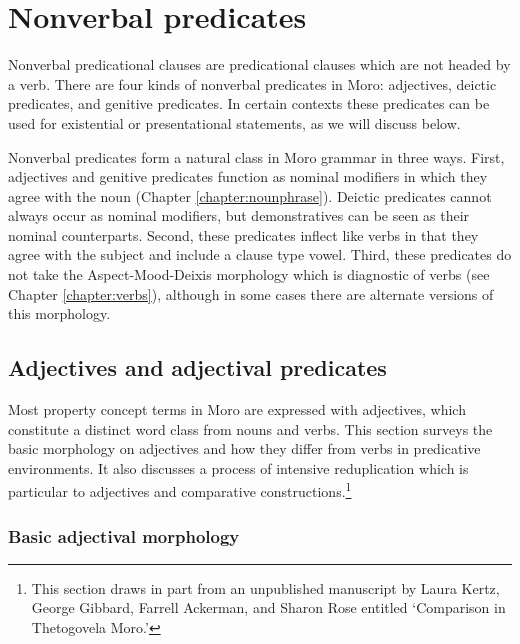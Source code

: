 \chapter{Nonverbal predicates}\label{chapter:nonverbal}

Nonverbal predicational clauses are predicational clauses which are not headed by a verb. There are four kinds of nonverbal predicates in Moro: adjectives, deictic predicates, and genitive predicates. In certain contexts these predicates can be used for existential or presentational statements, as we will discuss below. 

Nonverbal predicates form a natural class in Moro grammar in three ways. First, adjectives and genitive predicates function as nominal modifiers in which they agree with the noun (Chapter \ref{chapter:nounphrase}). Deictic predicates cannot always occur as nominal modifiers, but demonstratives can be seen as their nominal counterparts. Second, these predicates inflect like verbs in that they agree with the subject and include a clause type vowel. Third, these predicates do not take the Aspect-Mood-Deixis morphology which is diagnostic of verbs (see Chapter \ref{chapter:verbs}), although in some cases there are alternate versions of this morphology.


\section{Adjectives and adjectival predicates}\label{section:adjective}

Most property concept terms in Moro are expressed with adjectives, which constitute a distinct word class from nouns and verbs. This section surveys the basic morphology on adjectives and how they differ from verbs in predicative environments. It also discusses a process of intensive reduplication which is particular to adjectives and comparative constructions.\footnote{This section draws in part from an unpublished manuscript by Laura Kertz, George Gibbard, Farrell Ackerman, and Sharon Rose entitled `Comparison in Thetogovela Moro.'}

\subsection{Basic adjectival morphology}

